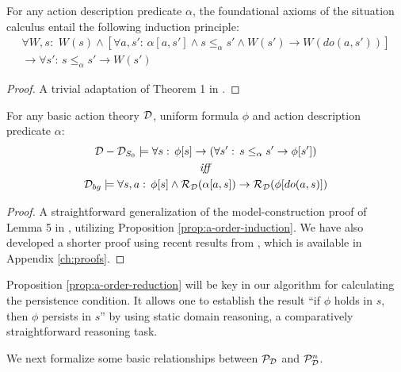 \begin{prop}
For any action description predicate $\alpha$, the foundational axioms
of the situation calculus entail the following induction principle:\label{prop:a-order-induction}\begin{multline*}
\forall W,s:\,\, W(s)\wedge\left[\forall a,s':\,\alpha[a,s']\wedge s\leq_{\alpha}s'\wedge W(s')\rightarrow W(do(a,s'))\right]\\
\rightarrow\forall s':\, s\leq_{\alpha}s'\rightarrow W(s')\end{multline*}

\end{prop}
\begin{proof}
A trivial adaptation of Theorem 1 in \citep{Reiter93proving}. 
\end{proof}
\begin{prop}
For any basic action theory $\mathcal{D}$, uniform formula $\phi$
and action description predicate $\alpha$:\label{prop:a-order-reduction}\begin{gather*}
\mathcal{D}-\mathcal{D}_{S_{0}}\models\forall s:\,\phi[s]\rightarrow\left(\forall s':\, s\leq_{\alpha}s'\rightarrow\phi[s']\right)\\
\mathit{iff}\\
\mathcal{D}_{bg}\models\forall s,a:\,\phi[s]\wedge\mathcal{R}_{\mathcal{D}}(\alpha[a,s])\rightarrow\mathcal{R}_{\mathcal{D}}(\phi[do(a,s)])\end{gather*}

\end{prop}
\begin{proof}
A straightforward generalization of the model-construction proof of
Lemma 5 in \citep{Lin94-StateConstraints}, utilizing Proposition
\ref{prop:a-order-induction}. We have also developed a shorter proof
using recent results from \citep{savelli06sc_quantum_levels}, which
is available in Appendix \ref{ch:proofs}. 
\end{proof}
Proposition \ref{prop:a-order-reduction} will be key in our algorithm
for calculating the persistence condition. It allows one to establish
the result {}``if $\phi$ holds in $s$, then $\phi$ persists in
$s$'' by using static domain reasoning, a comparatively straightforward
reasoning task.

We next formalize some basic relationships between $\mathcal{P}_{\mathcal{D}}$
and $\mathcal{P}_{\mathcal{D}}^{n}$.

